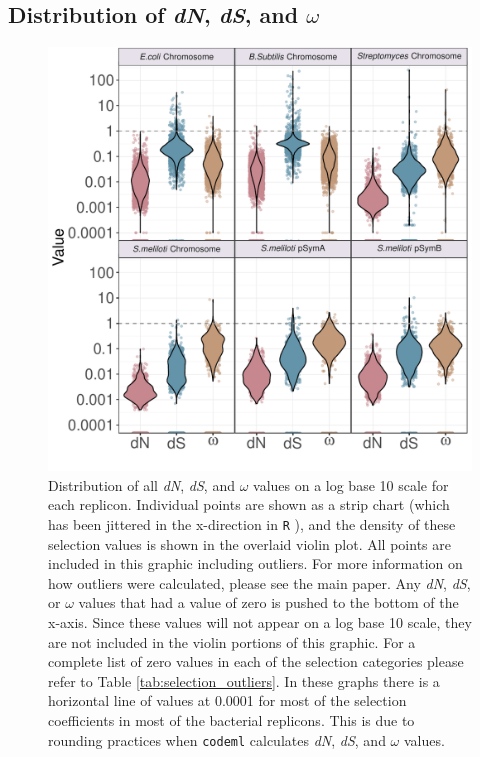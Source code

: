 \documentclass[11pt]{article}
\newcommand{\dn}{\textit{dN}\xspace}
\newcommand{\ds}{\textit{dS}\xspace}
\providecommand{\DIFaddbeginFL}{} %
\providecommand{\DIFaddendFL}{} %
\providecommand{\DIFdelbeginFL}{} %
\providecommand{\DIFdelendFL}{} %
\begin{document}
	\subsection{Distribution of \dn, \ds, and $\omega$}
	\begin{figure}
		\centering
		\DIFdelbeginFL %
\DIFdelendFL \DIFaddbeginFL \includegraphics[width=\textwidth]{./figs/ALL_BAC_dN_dS_omega_violinplots_22Sep20.pdf}
		\DIFaddendFL \caption{\label{fig:box_plots} Distribution of all \dn, \ds, and $\omega$ values on a log base 10 scale for each replicon. Individual points are shown as a strip chart (which has been jittered in the x-direction in \texttt{R} \citep{Wickham2019}), and the density of these selection values is shown in the overlaid violin plot. All points are included in this graphic including outliers. For more information on how outliers were calculated, please see the main paper. Any \dn, \ds, or $\omega$ values that had a value of zero is pushed to the bottom of the x-axis. Since these values will not appear on a log base 10 scale, they are not included in the violin portions of this graphic. For a complete list of zero values in each of the selection categories please refer to Table \ref{tab:selection_outliers}. In these graphs there is a horizontal line of values at 0.0001 for most of the selection coefficients in most of the bacterial replicons. This is due to rounding practices when \texttt{codeml} \citep{Yang97} calculates \dn, \ds, and $\omega$ values.}
	\end{figure}
\end{document}
